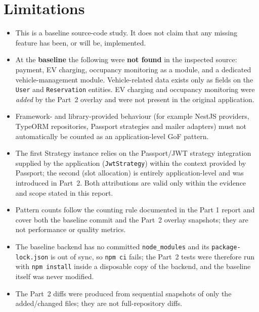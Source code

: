 \documentclass[11pt,a4paper]{article}
\begin{document}
\section{Limitations}
\begin{itemize}
  \item This is a baseline source-code study. It does not claim that any missing
        feature has been, or will be, implemented.
  \item At the \textbf{baseline} the following were \textbf{not found} in the
        inspected source: payment, EV charging, occupancy monitoring as a module,
        and a dedicated vehicle-management module. Vehicle-related data exists
        only as fields on the \texttt{User} and \texttt{Reservation} entities. EV
        charging and occupancy monitoring were \emph{added} by the Part~2 overlay
        and were not present in the original application.
  \item Framework- and library-provided behaviour (for example NestJS providers,
        TypeORM repositories, Passport strategies and mailer adapters) must not
        automatically be counted as an application-level GoF pattern.
  \item The first Strategy instance relies on the Passport/JWT strategy
        integration supplied by the application (\texttt{JwtStrategy}) within the
        context provided by Passport; the second (slot allocation) is entirely
        application-level and was introduced in Part~2. Both attributions are
        valid only within the evidence and scope stated in this report.
  \item Pattern counts follow the counting rule documented in the Part 1 report
        and cover both the baseline commit and the Part~2 overlay snapshots; they
        are not performance or quality metrics.
  \item The baseline backend has no committed \texttt{node\_modules} and its
        \texttt{package-lock.json} is out of sync, so \texttt{npm ci} fails; the
        Part~2 tests were therefore run with \texttt{npm install} inside a
        disposable copy of the backend, and the baseline itself was never
        modified.
  \item The Part~2 diffs were produced from sequential snapshots of only the
        added/changed files; they are not full-repository diffs.
\end{itemize}
\end{document}

